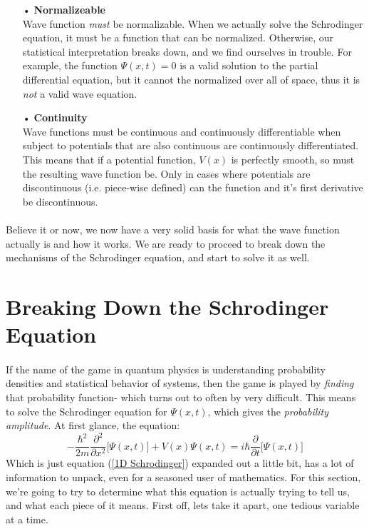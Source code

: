 \documentclass[12pt,letterpaper]{book}
\begin{document}
\begin{enumerate}
\item[•]\textbf{Normalizeable}\\
Wave function \textit{must} be normalizable. When we actually solve the Schrodinger equation, it must be a function that can be normalized. Otherwise, our statistical interpretation breaks down, and we find ourselves in trouble. For example, the function $\Psi(x,t) = 0$ is a valid solution to the partial differential equation, but it cannot the normalized over all of space, thus it is \textit{not} a valid wave equation.
\item[•]\textbf{Continuity}\\
Wave functions must be continuous and continuously differentiable when subject to potentials that are also continuous are continuously differentiated. This means that if a potential function, $V(x)$ is perfectly smooth, so must the resulting wave function be. Only in cases where potentials are discontinuous (i.e. piece-wise defined) can the function and it's first derivative be discontinuous.
\end{enumerate}

\paragraph*{}Believe it or now, we now have a very solid basis for what the wave function actually is and how it works. We are ready to proceed to break down the mechanisms of the Schrodinger equation, and start to solve it as well.


\section{Breaking Down the Schrodinger Equation}
\paragraph*{}If the name of the game in quantum physics is understanding probability densities and statistical behavior of systems, then the game is played by \textit{finding} that probability function- which turns out to often by very difficult. This means to solve the Schrodinger equation for $\Psi(x,t)$, which gives the \textit{probability amplitude}. At first glance, the equation:
\begin{equation}
\label{1D Schrodinger expanded}
-\frac{\hbar^2}{2m}\frac{\partial^2}{\partial x^2}\Big[ \Psi(x,t) \Big] +
V(x)\Psi(x,t) = i\hbar\frac{\partial}{\partial t}\Big[ \Psi(x,t) \Big]
\end{equation}
Which is just equation (\ref{1D Schrodinger}) expanded out a little bit, has a lot of information to unpack, even for a seasoned user of mathematics. For this section, we're going to try to determine what this equation is actually trying to tell us, and what each piece of it means. First off, lets take it apart, one tedious variable at a time. 
\end{document}
